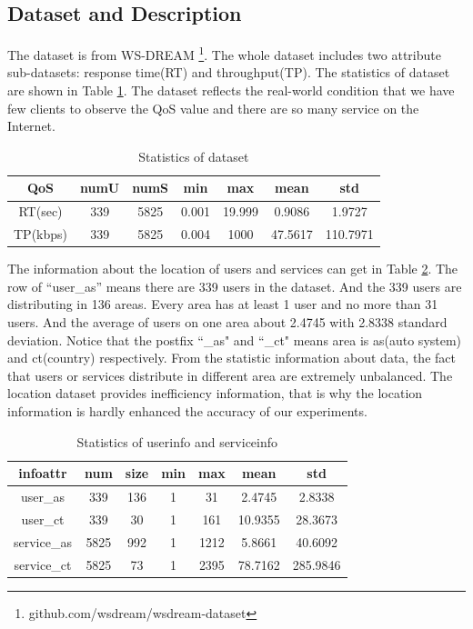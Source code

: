 \documentclass[conference]{IEEEtran}
\begin{document}
\subsection{Dataset and Description}
The dataset is from WS-DREAM \footnote{github.com/wsdream/wsdream-dataset}. The whole dataset includes two attribute sub-datasets: response time(RT) and throughput(TP). The statistics of dataset are shown in Table \ref{tb1}. The dataset reflects the real-world condition that we have few clients to observe the QoS value and there are so many service on the Internet. 
\begin{table}[H]
\begin{threeparttable}
\caption{Statistics of dataset}
\label{tb1}
\begin{tabular}{c||c|c|c|c|c|c} 
\hline 
QoS & numU & numS & min & max & mean & std \\ 
\hline 
RT(sec) & 339   & 5825  & 0.001 & 19.999 & 0.9086 & 1.9727 \\ 
\hline 
TP(kbps) & 339   & 5825  & 0.004 & 1000  & 47.5617 & 110.7971  \\ 
\hline 
\end{tabular} 
\end{threeparttable}
\end{table}

\par The information about the location of users and services can get in Table \ref{tb2}. The row of ``user\_as'' means there are 339 users in the dataset. And the 339 users are distributing in 136 areas. Every area has at least 1 user and no more than 31 users. And the average of users on one area about 2.4745 with 2.8338 standard deviation. Notice that the postfix ``\_as" and ``\_ct" means area is as(auto system) and ct(country) respectively. From the statistic information about data, the fact that users or services distribute in different area are extremely unbalanced. The location dataset provides inefficiency information, that is why the location information is hardly enhanced the accuracy of our experiments.

\begin{table}[H]
\begin{threeparttable}
\caption{Statistics of userinfo and serviceinfo}
\label{tb2}
\begin{tabular}{c||c|c||c|c|c|c}
\hline 
infoattr & num & size & min & max & mean & std \\
\hline
user\_as & 339   & 136   & 1     & 31    & 2.4745 & 2.8338 \\
\hline
user\_ct & 339   & 30    & 1     & 161   & 10.9355 & 28.3673 \\
\hline
service\_as & 5825  & 992   & 1     & 1212  & 5.8661 & 40.6092 \\
\hline
service\_ct & 5825  & 73    & 1     & 2395  & 78.7162 & 285.9846 \\
\hline
\end{tabular} 
\end{threeparttable}
\end{table}
\end{document}
